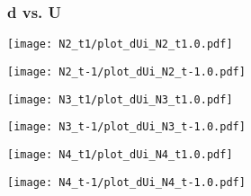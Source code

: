 \documentclass{beamer}
\begin{document}
\begin{frame}\frametitle{d vs. U}
	\begin{center}
		\begin{minipage}[t]{0.44\textwidth}
			\texttt{[image: N2\_t1/plot\_dUi\_N2\_t1.0.pdf]}
		\end{minipage}
		\begin{minipage}[t]{0.44\textwidth}
			\texttt{[image: N2\_t-1/plot\_dUi\_N2\_t-1.0.pdf]}
		\end{minipage}
		
		\begin{minipage}[t]{0.44\textwidth}
			\texttt{[image: N3\_t1/plot\_dUi\_N3\_t1.0.pdf]}
		\end{minipage}
		\begin{minipage}[t]{0.44\textwidth}
			\texttt{[image: N3\_t-1/plot\_dUi\_N3\_t-1.0.pdf]}
		\end{minipage}
		
		\begin{minipage}[t]{0.44\textwidth}
			\texttt{[image: N4\_t1/plot\_dUi\_N4\_t1.0.pdf]}
		\end{minipage}
		\begin{minipage}[t]{0.44\textwidth}
			\texttt{[image: N4\_t-1/plot\_dUi\_N4\_t-1.0.pdf]}
		\end{minipage}
	\end{center}	
\end{frame}
\end{document}
